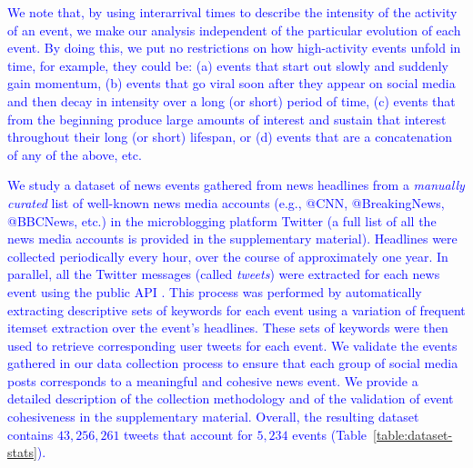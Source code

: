 \documentclass[10pt,letterpaper]{article}
\newcommand{\newtext}[1]{{\leavevmode\color{blue}#1}}
\begin{document}
\textcolor{blue}{We note that, by using interarrival times to describe the intensity of the
activity of an event, we make our analysis independent of the particular
evolution of each event. By doing this, we put no restrictions on how
high-activity events unfold in time, for example, they could be: (a) events
that start out slowly and
suddenly gain momentum, (b) events that go viral soon after they appear on
social media and then decay in intensity over a long (or short) period of
time, (c) events that from the beginning produce large amounts of interest and
sustain that interest throughout their long (or short) lifespan, or (d)
events that are a concatenation of any of the above, etc.}


\textcolor{blue}{We study a dataset of news events gathered from news
headlines from a \emph{manually curated} list of well-known news media
accounts (e.g., @CNN, @BreakingNews, @BBCNews, etc.) in the
microblogging platform Twitter \cite{Twitter_website}
(a full list of all the news media
accounts is provided in the supplementary material). Headlines were
collected periodically every hour, over the course of approximately
one year. In parallel, all the Twitter messages (called \emph{tweets})
were extracted for each news event using the public
API \cite{Twitter_API}.}
\textcolor{blue}{This process was performed by automatically extracting descriptive
sets of keywords for each event using a variation of frequent itemset
extraction \cite{Tan_Steinbach_Kumar} over the event's headlines.
These sets of keywords were then used to retrieve corresponding user
tweets for each event. We validate the events gathered in our
data collection process to ensure that each group of social media
posts corresponds to a meaningful and cohesive news event. We provide a detailed
description of the collection methodology and of the validation of event
cohesiveness in the supplementary material. Overall, the resulting dataset contains
$43,256,261$ tweets that account for $5,234$ events (Table~\ref{table:dataset-stats}).}
\end{document}
